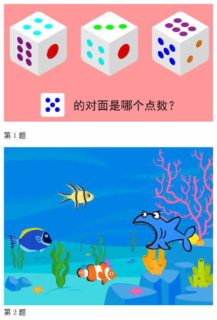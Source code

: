 \documentclass[10pt, a4paper]{article}
\begin{document}
\begin{enumerate}
        \begin{figure}[htbp]
            \centering
            \begin{minipage}[t]{.2\textwidth}
                \centering
                \includegraphics[width=\textwidth]{figure/1.png}
                \caption*{第 1 题}
            \end{minipage}
            \begin{minipage}[t]{.15\textwidth}
                \centering
                \includegraphics[width=\textwidth]{figure/2.png}
                \caption*{第 2 题}
            \end{minipage}
            \begin{minipage}[t]{.16\textwidth}
                \centering

\end{minipage}
\end{figure}
\end{enumerate}
\end{document}
